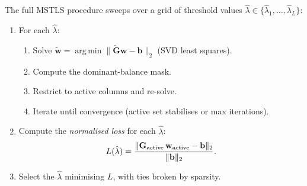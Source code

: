 \documentclass[11pt]{article}
\DeclareMathOperator*{\argmin}{arg\,min}
\begin{document}
The full MSTLS procedure sweeps over a grid of threshold values
$\hat{\lambda} \in \{\hat{\lambda}_1, \ldots, \hat{\lambda}_L\}$:

\begin{enumerate}[leftmargin=*]
\item For each $\hat{\lambda}$:
  \begin{enumerate}
    \item Solve $\tilde{\mathbf{w}} = \argmin \|\tilde{\mathbf{G}}\mathbf{w} - \mathbf{b}\|_2$
      (SVD least squares).
    \item Compute the dominant-balance mask.
    \item Restrict to active columns and re-solve.
    \item Iterate until convergence (active set stabilises or max iterations).
  \end{enumerate}
\item Compute the \emph{normalised loss} for each $\hat{\lambda}$:
  \begin{equation}
    L(\hat{\lambda}) = \frac{\|\mathbf{G}_{\rm active}\,\mathbf{w}_{\rm active} - \mathbf{b}\|_2}{\|\mathbf{b}\|_2}.
  \end{equation}
\item Select the $\hat{\lambda}$ minimising $L$, with ties broken by sparsity.
\end{enumerate}
\end{document}
